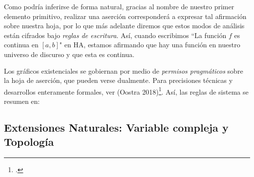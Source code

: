 \documentclass[
	fontsize=10pt, %
	twoside=false, %
	secnumdepth=1, %
	abstract=true, %
]{kaohandt}
\begin{document}
Como podría inferirse de forma natural, gracias al nombre de nuestro primer elemento primitivo, realizar una aserción corresponderá a expresar tal afirmación sobre nuestra hoja, por lo que más adelante diremos que estos modos de análisis están cifrados bajo \textit{reglas de escritura}. Así, cuando escribimos ``La función $f$ es continua en $[a,b]$" en HA, estamos afirmando que hay una función en nuestro universo de discurso y que esta es continua.


\begin{marginfigure}[h!]
\begin{center}  





\end{center}    
\end{marginfigure}

Los gráficos existenciales se gobiernan por medio de \emph{permisos pragmáticos} sobre la hoja de aserción, que pueden verse dualmente. Para precisiones técnicas y desarrollos enteramente formales, ver (Oostra 2018)\footnote[5]{\cite{OostraLibro}.}. Así, las  reglas de sistema se resumen en:


\subsection{Extensiones Naturales: Variable compleja y Topología}

\end{document}
